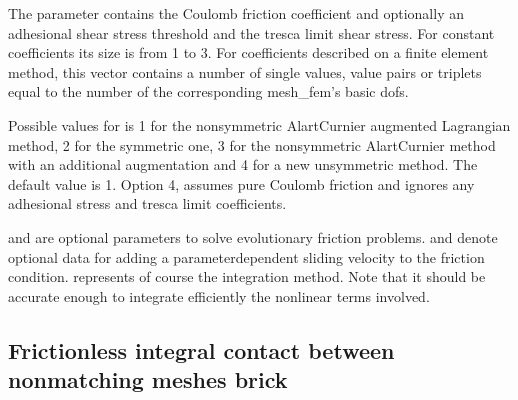 \documentclass[a4paper,11pt,english]{sphinxmanual}
\begin{document}
The parameter  contains the Coulomb friction
coefficient and optionally an adhesional shear stress threshold and the
tresca limit shear stress. For constant coefficients its size is from
1 to 3. For coefficients described on a finite element method, this
vector contains a number of single values, value pairs or triplets
equal to the number of the corresponding mesh\_fem’s basic dofs.

Possible values for  is 1 for the non\sphinxhyphen{}symmetric Alart\sphinxhyphen{}Curnier
augmented Lagrangian method, 2 for the symmetric one, 3 for the
non\sphinxhyphen{}symmetric Alart\sphinxhyphen{}Curnier method with an additional augmentation
and 4 for a new unsymmetric method. The default value is 1.
Option 4, assumes pure Coulomb friction and ignores any adhesional stress
and tresca limit coefficients.

 and  are optional parameters to solve
evolutionary friction problems.  and  denote
optional data for adding a parameter\sphinxhyphen{}dependent sliding velocity to the friction
condition.  represents of course the integration method. Note that it
should be accurate enough to integrate efficiently the nonlinear terms involved.


\subsection{Frictionless integral contact between non\sphinxhyphen{}matching meshes brick}
\label{\detokenize{userdoc/model_contact_friction:frictionless-integral-contact-between-non-matching-meshes-brick}}
\begin{sphinxVerbatim}[commandchars=\\\{\}]
         
         
\end{sphinxVerbatim}
\end{document}

